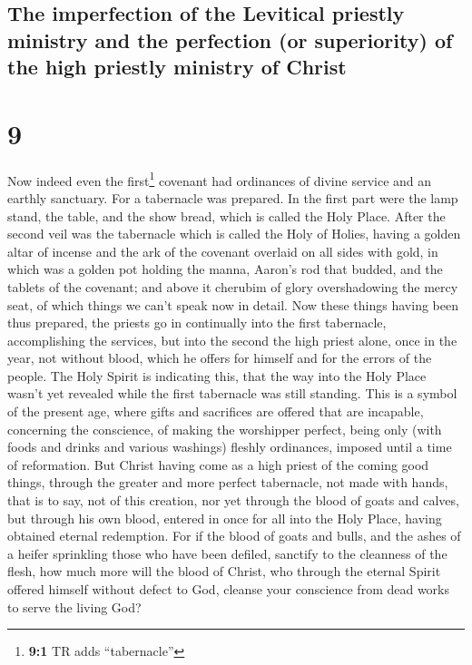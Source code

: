 \hypertarget{the-imperfection-of-the-levitical-priestly-ministry-and-the-perfection-or-superiority-of-the-high-priestly-ministry-of-christ}{%
\subsection{The imperfection of the Levitical priestly ministry and the
perfection (or superiority) of the high priestly ministry of
Christ}\label{the-imperfection-of-the-levitical-priestly-ministry-and-the-perfection-or-superiority-of-the-high-priestly-ministry-of-christ}}

\hypertarget{section-8}{%
\section{9}\label{section-8}}

 Now indeed even the first\footnote{\textbf{9:1} TR adds
  ``tabernacle''} covenant had ordinances of divine service and an
earthly sanctuary.  For a tabernacle was prepared. In the
first part were the lamp stand, the table, and the show bread, which is
called the Holy Place.  After the second veil was the
tabernacle which is called the Holy of Holies,  having a
golden altar of incense and the ark of the covenant overlaid on all
sides with gold, in which was a golden pot holding the manna, Aaron's
rod that budded, and the tablets of the covenant;  and
above it cherubim of glory overshadowing the mercy seat, of which things
we can't speak now in detail.  Now these things having
been thus prepared, the priests go in continually into the first
tabernacle, accomplishing the services,  but into the
second the high priest alone, once in the year, not without blood, which
he offers for himself and for the errors of the people. 
The Holy Spirit is indicating this, that the way into the Holy Place
wasn't yet revealed while the first tabernacle was still standing.
 This is a symbol of the present age, where gifts and
sacrifices are offered that are incapable, concerning the conscience, of
making the worshipper perfect,  being only (with foods
and drinks and various washings) fleshly ordinances, imposed until a
time of reformation.  But Christ having come as a high
priest of the coming good things, through the greater and more perfect
tabernacle, not made with hands, that is to say, not of this creation,
 nor yet through the blood of goats and calves, but
through his own blood, entered in once for all into the Holy Place,
having obtained eternal redemption.  For if the blood of
goats and bulls, and the ashes of a heifer sprinkling those who have
been defiled, sanctify to the cleanness of the flesh, 
how much more will the blood of Christ, who through the eternal Spirit
offered himself without defect to God, cleanse your conscience from dead
works to serve the living God?

